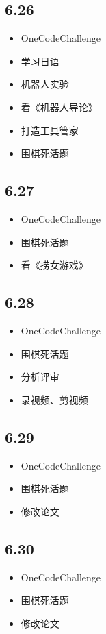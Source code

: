 \documentclass[UTF8]{ctexart}
\begin{document}
\subsection*{6.26}
\begin{itemize}
    \item OneCodeChallenge
    \item 学习日语
    \item 机器人实验
    \item 看《机器人导论》
    \item 打造工具管家
    \item 围棋死活题
\end{itemize}

\subsection*{6.27}
\begin{itemize}
    \item OneCodeChallenge
    \item 围棋死活题
    \item 看《捞女游戏》
\end{itemize}

\subsection*{6.28}
\begin{itemize}
    \item OneCodeChallenge
    \item 围棋死活题
    \item 分析评审
    \item 录视频、剪视频
\end{itemize}

\subsection*{6.29}
\begin{itemize}
    \item OneCodeChallenge
    \item 围棋死活题
    \item 修改论文
\end{itemize}

\subsection*{6.30}
\begin{itemize}
    \item OneCodeChallenge
    \item 围棋死活题
    \item 修改论文
\end{itemize}
\end{document}
